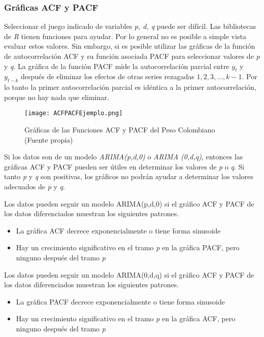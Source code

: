 \subsubsection{Gráficas ACF y PACF}
Seleccionar el juego indicado de variables \emph{p, d, q} puede ser difícil. Las bibliotecas de \emph{R} tienen funciones para ayudar. Por lo general no es posible a simple vista evaluar estos valores. Sin embargo, si es posible utilizar las gráficas de la función de autocorrelación ACF y su función asociada PACF para seleccionar valores de \textit{p} y \textit{q}. La gráfica de la función PACF mide la autocorrelación parcial entre $y_{t}$ y $y_{t-k}$ después de eliminar los efectos de otras series rezagadas $1, 2, 3, \ldots, k-1$. Por lo tanto la primer autocorrelación parcial es idéntica a la primer autocorrelación, porque no hay nada que eliminar. 

\begin{figure}[h!]
    \centering
    \texttt{[image: ACFPACFEjemplo.png]}
    \caption{Gráficas de las Funciones ACF y PACF del Peso Colombiano (Fuente propia)}
\end{figure}

Si los datos son de un modelo \textit{ARIMA(p,d,0)} o \textit{ARIMA (0,d,q)}, entonces las gráficas ACF y PACF pueden ser útiles en determinar los valores de \emph{p} o \emph{q}. Si tanto \emph{p} y \emph{q} son positivas, los gráficos no podrán ayudar a determinar los valores adecuados de \emph{p} y \emph{q}. 

Los datos pueden seguir un modelo ARIMA(p,d,0) si el gráfico ACF y PACF de los datos diferenciados muestran los siguientes patrones. 
\begin{itemize}
	\item La gráfica ACF decrece exponencialmente o tiene forma sinusoide 
	\item Hay un crecimiento significativo en el tramo \textit{p} en la gráfica PACF, pero ninguno después del tramo \textit{p}
\end{itemize}

Los datos pueden seguir un modelo ARIMA(0,d,q) si el gráfico ACF y PACF de los datos diferenciados muestran los siguientes patrones. 
\begin{itemize}
	\item La gráfica PACF decrece exponencialmente o tiene forma sinusoide 
	\item Hay un crecimiento significativo en el tramo \textit{p} en la gráfica ACF, pero ninguno después del tramo \textit{p}
\end{itemize}
